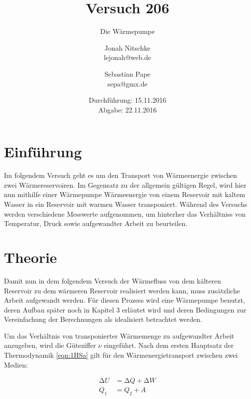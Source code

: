 
\title{Versuch 206}
\subtitle{Die Wärmepumpe}
\author{Jonah Nitschke\\
        lejonah@web.de \and
        Sebastian Pape\\
        sepa@gmx.de}
\date{Durchführung: 15.11.2016\\
      Abgabe: 22.11.2016}



\maketitle
\tableofcontents
\newpage

\section{Einführung}

Im folgendem Versuch geht es um den Transport von Wärmeenergie zwischen zwei Wärmereservoiren.
Im Gegensatz zu der allgemein gültigen Regel, wird hier nun mithilfe einer Wärmepumpe
Wärmeenergie von einem Reservoir mit kaltem Wasser in ein Reservoir mit warmen Wasser transponiert.
Während des Versuchs werden verschiedene Messwerte aufgenommen, um hinterher das Verhältniss von Temperatur,
Druck sowie aufgewandter Arbeit zu beurteilen.

\section{Theorie}


Damit nun in dem folgendem Versuch der Wärmefluss von dem kälteren Reservoir zu dem
wärmeren Reservoir realisiert werden kann, muss zusätzliche Arbeit aufgewandt werden. Für diesen Prozess wird eine Wärmepumpe benutzt, deren Aufbau später noch in Kapitel 3 erläutet wird und deren Bedingungen
zur Vereinfachung der Berechnungen als idealisiert betrachtet werden.

Um das Verhältnis von transponierter Wärmemenge zu aufgewandter Arbeit anzugeben, wird die Güteziffer
$\nu$ eingeführt. Nach dem ersten Hauptsatz der Thermodynamik \eqref{eqn:1HSa} gilt für den Wärmenergietransport
zwischen zwei Medien:

\begin{align}
  \increment U &= \increment Q + \increment W \label{eqn:1HSa} \\
  Q_1          &= Q_2 + A   \label{eqn:1HSb}
\end{align}

